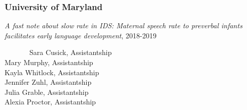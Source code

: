 \documentclass[10pt,a4paper,]{article}
\begin{document}
\hypertarget{university-of-maryland}{%
\subsubsection{University of Maryland}\label{university-of-maryland}}

\emph{A fast note about slow rate in IDS: Maternal speech rate to preverbal infants facilitates early language development}, 2018-2019

~~~~~~~Sara Cusick, Assistantship\\
\hspace*{0.333em}\hspace*{0.333em}\hspace*{0.333em}\hspace*{0.333em}\hspace*{0.333em}\hspace*{0.333em}\hspace*{0.333em}Mary Murphy, Assistantship\\
\hspace*{0.333em}\hspace*{0.333em}\hspace*{0.333em}\hspace*{0.333em}\hspace*{0.333em}\hspace*{0.333em}\hspace*{0.333em}Kayla Whitlock, Assistantship\\
\hspace*{0.333em}\hspace*{0.333em}\hspace*{0.333em}\hspace*{0.333em}\hspace*{0.333em}\hspace*{0.333em}\hspace*{0.333em}Jennifer Zuhl, Assistantship\\
\hspace*{0.333em}\hspace*{0.333em}\hspace*{0.333em}\hspace*{0.333em}\hspace*{0.333em}\hspace*{0.333em}\hspace*{0.333em}Julia Grable, Assistantship\\
\hspace*{0.333em}\hspace*{0.333em}\hspace*{0.333em}\hspace*{0.333em}\hspace*{0.333em}\hspace*{0.333em}\hspace*{0.333em}Alexia Proctor, Assistantship
\end{document}

